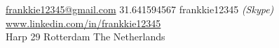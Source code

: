 \documentclass[10pt,a4paper]{article}
\begin{document}
\sloppy  %


\nobreakvspace{0.3em}  %

\noindent\href{mailto:frankkie12345@gmail.com}{frankkie12345\mbox{}@\mbox{}gmail.com}\sbull
\textsmaller{+}31.641594567\sbull
frankkie12345 \emph{(Skype)}\sbull
\href{http://www.linkedin.com/in/frankkie12345}{www.linkedin.com/in/frankkie12345}
\\
Harp 29\sbull
Rotterdam\sbull
The Netherlands

\spacedhrule{0.9em}{-0.4em}  %

\end{document}
